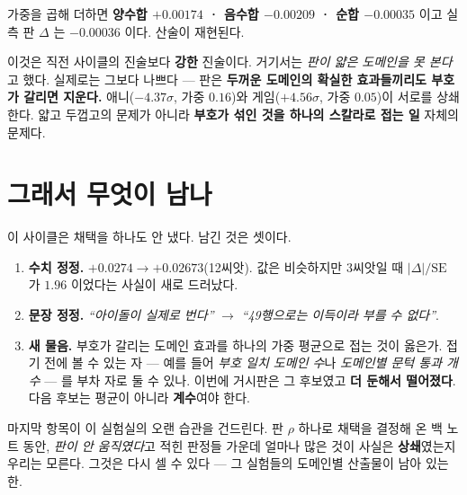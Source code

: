 \documentclass[10pt]{article}
\begin{document}
가중을 곱해 더하면 \textbf{양수합 $+0.00174$ · 음수합 $-0.00209$ · 순합
$-0.00035$} 이고 실측 판 $\Delta$ 는 $-0.00036$ 이다. 산술이 재현된다.


이것은 직전 사이클의 진술보다 \textbf{강한} 진술이다. 거기서는 \emph{판이 얇은
도메인을 못 본다}고 했다. 실제로는 그보다 나쁘다 --- 판은 \textbf{두꺼운
도메인의 확실한 효과들끼리도 부호가 갈리면 지운다.} 애니($-4.37\sigma$,
가중 $0.16$)와 게임($+4.56\sigma$, 가중 $0.05$)이 서로를 상쇄한다. 얇고
두껍고의 문제가 아니라 \textbf{부호가 섞인 것을 하나의 스칼라로 접는 일}
자체의 문제다.

\section{그래서 무엇이 남나}

이 사이클은 채택을 하나도 안 냈다. 남긴 것은 셋이다.

\begin{enumerate}\itemsep3pt
\item \textbf{수치 정정.} $+0.0274 \to +0.02673$(12씨앗). 값은 비슷하지만
      3씨앗일 때 $|\Delta|/\mathrm{SE}$ 가 $1.96$ 이었다는 사실이 새로 드러났다.
\item \textbf{문장 정정.} \emph{``아이돌이 실제로 번다''} $\to$
      \emph{``49행으로는 이득이라 부를 수 없다''}.
\item \textbf{새 물음.} 부호가 갈리는 도메인 효과를 하나의 가중 평균으로
      접는 것이 옳은가. 접기 전에 볼 수 있는 자 --- 예를 들어 \emph{부호 일치
      도메인 수}나 \emph{도메인별 문턱 통과 개수} --- 를 부차 자로 둘 수 있나.
      이번에 거시판은 그 후보였고 \textbf{더 둔해서 떨어졌다}. 다음 후보는
      평균이 아니라 \textbf{계수}여야 한다.
\end{enumerate}

마지막 항목이 이 실험실의 오랜 습관을 건드린다. 판 $\rho$ 하나로 채택을
결정해 온 백 노트 동안, \emph{판이 안 움직였다}고 적힌 판정들 가운데 얼마나
많은 것이 사실은 \textbf{상쇄}였는지 우리는 모른다. 그것은 다시 셀 수 있다 ---
그 실험들의 도메인별 산출물이 남아 있는 한.
\end{document}
